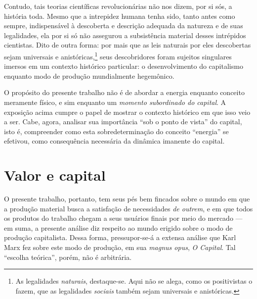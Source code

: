 Contudo, tais teorias científicas revolucionárias não nos dizem, por si sós, a história toda. Mesmo que a intrepidez humana tenha sido, tanto antes como sempre, indispensável à descoberta e descrição adequada da natureza e de suas legalidades, ela por si só não assegurou a subsistência material desses intrépidos cientistas. Dito de outra forma: por mais que as leis naturais por eles descobertas sejam universais e anistóricas,\footnote{As legalidades \emph{naturais}, destaque-se. Aqui não se alega, como os positivistas o fazem, que as legalidades \emph{sociais} também sejam universais e anistóricas.} seus descobridores foram sujeitos singulares imersos em um contexto histórico particular: o desenvolvimento do capitalismo enquanto modo de produção mundialmente hegemônico.

O propósito do presente trabalho não é de abordar a energia enquanto conceito meramente físico, e sim enquanto um \emph{momento subordinado do capital}. A exposição acima cumpre o papel de mostrar o contexto histórico em que isso veio a ser. Cabe, agora, analisar sua importância ``sob o ponto de vista'' do capital, isto é, compreender como esta sobredeterminação do conceito ``energia'' se efetivou, como consequência necessária da dinâmica imanente do capital.

\section{Valor e capital}
O presente trabalho, portanto, tem seus pés bem fincados sobre o mundo em que a produção material busca a satisfação de necessidades \emph{de outrem}, e em que todos os produtos do trabalho chegam a seus usuários finais por meio do mercado --- em suma, a presente análise diz respeito ao mundo erigido sobre o modo de produção capitalista. Dessa forma, pressupor-se-á a extensa análise que Karl Marx fez sobre este modo de produção, em sua \emph{magnus opus}, \emph{O Capital}. Tal ``escolha teórica'', porém, não é arbitrária.

